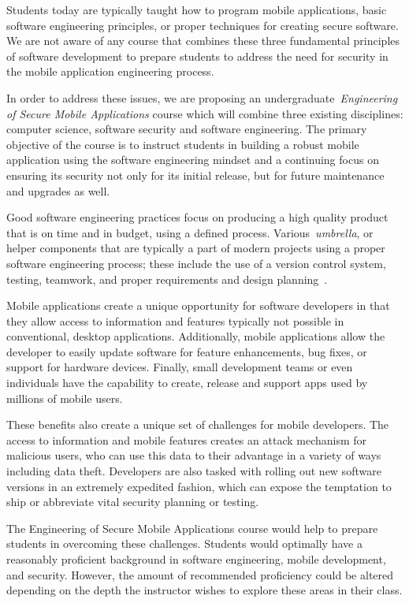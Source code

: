 \documentclass{sig-alternate}
\begin{document}
Students today are typically taught how to program mobile applications, basic software engineering principles, or proper techniques for creating secure software. We are not aware of any course that combines these three fundamental principles of software development to prepare students to address the need for security in the mobile application engineering process.

In order to address these issues, we are proposing an undergraduate~\emph{Engineering of Secure Mobile Applications} course which will combine three existing disciplines: computer science, software security and software engineering. The primary objective of the course is to instruct students in building a robust mobile application using the software engineering mindset and a continuing focus on ensuring its security not only for its initial release, but for future maintenance and upgrades as well.

Good software engineering practices focus on producing a high quality product that is on time and in budget, using a defined process. Various~\emph{umbrella}, or helper components that are typically a part of modern projects using a proper software engineering process; these include the use of a version control system, testing, teamwork, and proper requirements and design planning~\cite{pressman}.

Mobile applications create a unique opportunity for software developers in that they allow access to information and features typically not possible in conventional, desktop applications. Additionally, mobile applications allow the developer to easily update software for feature enhancements, bug fixes, or support for hardware devices. Finally, small development teams or even individuals have the capability to create, release and support apps used by millions of mobile users.

These benefits also create a unique set of challenges for mobile developers. The access to information and mobile features creates an attack mechanism for malicious users, who can use this data to their advantage in a variety of ways including data theft. Developers are also tasked with rolling out new software versions in an extremely expedited fashion, which can expose the temptation to ship or abbreviate vital security planning or testing.

The Engineering of Secure Mobile Applications course would help to prepare students in overcoming these challenges. Students would optimally have a reasonably proficient background in software engineering, mobile development, and security. However, the amount of recommended proficiency could be altered depending on the depth the instructor wishes to explore these areas in their class.
\end{document}

